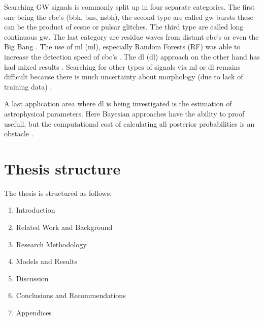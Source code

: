 Searching GW signals is commonly split up in four separate categories. The first one being the \acrshort{cbc}'s (\acrshort{bbh}, \acrshort{bns}, \acrshort{nsbh}), the second type are called \acrshort{gw} bursts these can be the product of \acrshort{ccsne} or pulsar glitches. The third type are called long continuous \acrshort{gw}. The last category are residue waves from distant \acrshort{cbc}'s or even the Big Bang
\citep{abbott2020guide, LIGO_continuous}. The use of \acrlong{ml} (\acrshort{ml}), especially Random Forests (RF) was able to increase the detection speed of \acrshort{cbc}'s \citep{kapadia2017classifier}. The \acrlong{dl} (\acrshort{dl}) approach on the other hand has had mixed results \citep{gebhard2019convolutional,chatterjee2021extraction,ruan2023rapid}. 
Searching for other types of signals via \acrshort{ml} or \acrshort{dl} remains difficult because there is much uncertainty about morphology (due to lack of training data) \citep{cuoco2020enhancing}. 

A last application area where \acrshort{dl} is being investigated is the estimation of astrophysical parameters. Here Bayesian approaches have the ability to proof usefull, but the computational cost of calculating all posterior probabilities is an obstacle \citep{cuoco2020enhancing}.

\section{Thesis structure}
The thesis is structured as follows: 
\begin{enumerate}
    \item Introduction
    \item Related Work and Background
    \item Research Methodology
    \item Models and Results
    \item Discussion
    \item Conclusions and Recommendations
    \item Appendices
\end{enumerate}
\newpage




